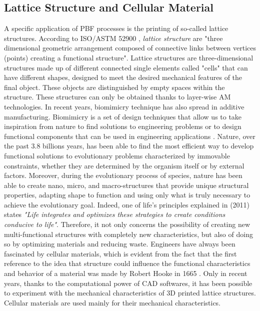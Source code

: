 \subsection{Lattice Structure and Cellular Material} \label{subsec:lattice}
A specific application of PBF processes is the printing of so-called lattice structures. According to ISO/ASTM 52900 \cite{international_standard_organization_isoastm_2015}, \emph{lattice structure} are "three dimensional geometric arrangement composed of connective links between vertices (points) creating a functional structure". Lattice structures are three-dimensional structures made up of different connected single elements called "cells" that can have different shapes, designed to meet the desired mechanical features of the final object. These objects are distinguished by empty spaces within the structure. These structures can only be obtained thanks to layer-wise AM technologies. In recent years, biomimicry technique has also spread in additive manufacturing. Biomimicry is a set of design techniques that allow us to take inspiration from nature to find solutions to engineering problems or to design functional components that can be used in engineering applications \cite{pathak_biomimicry_2019, du_plessis_beautiful_2019}. Nature, over the past 3.8 billions years, has been able to find the most efficient way to develop functional solutions to evolutionary problems characterized by immovable constraints, whether they are determined by the organism itself or by external factors. Moreover, during the evolutionary process of species, nature has been able to create nano, micro, and macro-structures that provide unique structural properties, adapting shape to function and using only what is truly necessary to achieve the evolutionary goal. Indeed, one of life's principles explained in \citeauthor{baumeister_biomimicry_2011} (2011) states \textit{"Life integrates and optimizes these strategies to create conditions conducive to life"}. Therefore, it not only concerns the possibility of creating new multi-functional structures with completely new characteristics, but also of doing so by optimizing materials and reducing waste. Engineers have always been fascinated by cellular materials, which is evident from the fact that the first reference to the idea that structure could influence the functional characteristics and behavior of a material was made by Robert Hooke in 1665 \cite{l_gibson_cellular_2010}. Only in recent years, thanks to the computational power of CAD softwares, it has been possible to experiment with the mechanical characteristics of 3D printed lattice structures. Cellular materials are used mainly for their mechanical characteristics.
